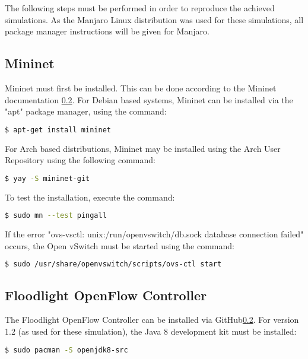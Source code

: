 The following steps must be performed in order to reproduce the achieved
simulations. As the Manjaro Linux distribution was used for these simulations,
all package manager instructions will be given for Manjaro.

\subsection{Mininet}

Mininet must first be installed. This can be done according to the Mininet
documentation \ref{}. For Debian based systems, Mininet can be installed via the
"apt" package manager, using the command:

\begin{lstlisting}[language=bash, caption=Debian-based Distro Mininet Install]
	$ apt-get install mininet
\end{lstlisting}

For Arch based distributions, Mininet may be installed using the Arch User
Repository using the following command:

\begin{lstlisting}[language=bash, caption=Arch-based Distro Mininet Install]
	$ yay -S mininet-git
\end{lstlisting}

To test the installation, execute the command:

\begin{lstlisting}[language=bash, caption=Mininet installation test]
	$ sudo mn --test pingall
\end{lstlisting}

If the error "ovs-vsctl: unix:/run/openvswitch/db.sock database connection
failed" occurs, the Open vSwitch must be started using the command:

\begin{lstlisting}[language=bash, caption=Open vSwitch service start command]
	$ sudo /usr/share/openvswitch/scripts/ovs-ctl start
\end{lstlisting}

\subsection{Floodlight OpenFlow Controller}

The Floodlight OpenFlow Controller can be installed via GitHub\ref{}. For
version 1.2 (as used for these simulation), the Java 8 development kit must be
installed:

\begin{lstlisting}[language=bash, caption=openjdk8 installation]
	$ sudo pacman -S openjdk8-src
\end{lstlisting}

